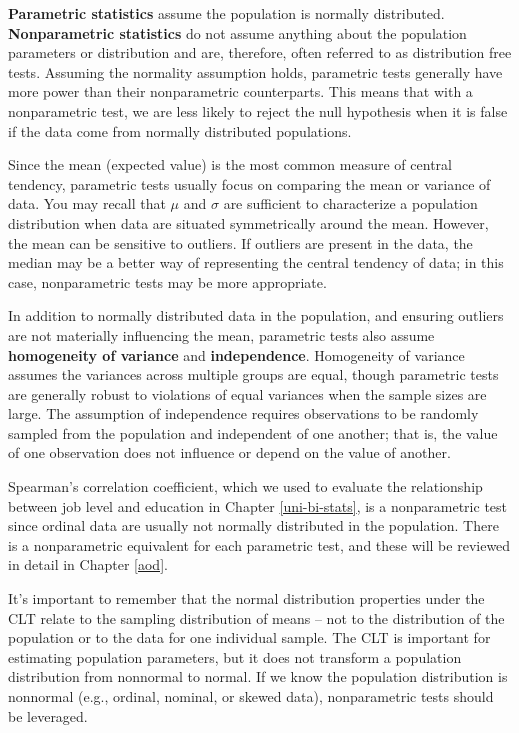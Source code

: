 \documentclass[]{book}
\begin{document}
\textbf{Parametric statistics} assume the population is normally distributed. \textbf{Nonparametric statistics} do not assume anything about the population parameters or distribution and are, therefore, often referred to as distribution free tests. Assuming the normality assumption holds, parametric tests generally have more power than their nonparametric counterparts. This means that with a nonparametric test, we are less likely to reject the null hypothesis when it is false if the data come from normally distributed populations.

Since the mean (expected value) is the most common measure of central tendency, parametric tests usually focus on comparing the mean or variance of data. You may recall that \(\mu\) and \(\sigma\) are sufficient to characterize a population distribution when data are situated symmetrically around the mean. However, the mean can be sensitive to outliers. If outliers are present in the data, the median may be a better way of representing the central tendency of data; in this case, nonparametric tests may be more appropriate.

In addition to normally distributed data in the population, and ensuring outliers are not materially influencing the mean, parametric tests also assume \textbf{homogeneity of variance} and \textbf{independence}. Homogeneity of variance assumes the variances across multiple groups are equal, though parametric tests are generally robust to violations of equal variances when the sample sizes are large. The assumption of independence requires observations to be randomly sampled from the population and independent of one another; that is, the value of one observation does not influence or depend on the value of another.

Spearman's correlation coefficient, which we used to evaluate the relationship between job level and education in Chapter \ref{uni-bi-stats}, is a nonparametric test since ordinal data are usually not normally distributed in the population. There is a nonparametric equivalent for each parametric test, and these will be reviewed in detail in Chapter \ref{aod}.

It's important to remember that the normal distribution properties under the CLT relate to the sampling distribution of means -- not to the distribution of the population or to the data for one individual sample. The CLT is important for estimating population parameters, but it does not transform a population distribution from nonnormal to normal. If we know the population distribution is nonnormal (e.g., ordinal, nominal, or skewed data), nonparametric tests should be leveraged.
\end{document}
